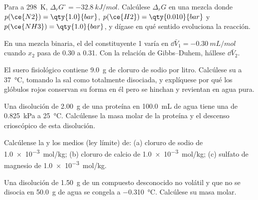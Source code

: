 \begin{exercise}[$\star$]\label{exo:b2:chemical-potential:4}
Para  a \qty{298}{K}, $\Delta_r G^\circ =
\qty{-32.8}{kJ/mol}$. Calcúlese $\Delta_r G$ en una mezcla donde
$p(\ce{N2}) = \qty{1.0}{bar}$, $p(\ce{H2}) = \qty{0.010}{bar}$ y
$p(\ce{NH3}) = \qty{1.0}{bar}$, y dígase en qué sentido evoluciona la reacción.
\end{exercise}

\begin{exercise}[$\star\star$]\label{exo:b2:chemical-potential:5}
En una mezcla binaria, el  del constituyente 1 varía en
$\dd\bar V_1 = \qty{-0.30}{mL/mol}$ cuando $x_2$ pasa de 0.30 a 0.31. Con la
relación de Gibbs--Duhem, hállese $\dd\bar V_2$.
\end{exercise}

\begin{exercise}[$\star\star$]\label{exo:b2:chemical-potential:6}
El suero fisiológico contiene \qty{9.0}{g} de cloruro de sodio por litro.
Calcúlese su  a \qty{37}{\celsius}, tomando la sal como totalmente
disociada, y explíquese por qué los glóbulos rojos conservan su forma en él pero se hinchan
y revientan en agua pura.
\end{exercise}

\begin{exercise}[$\star\star$]\label{exo:b2:chemical-potential:7}
Una disolución de \qty{2.00}{g} de una proteína en \qty{100.0}{mL} de agua tiene una
 de \qty{0.825}{kPa} a \qty{25}{\celsius}. Calcúlense la masa
molar de la proteína y el descenso crioscópico de esta disolución.
\end{exercise}

\begin{exercise}[$\star\star$]\label{exo:b2:chemical-potential:8}
Calcúlense la  y los  medios (ley límite)
de: (a) cloruro de sodio de \qty{1.0e-3}{mol/kg}; (b) cloruro de calcio de \qty{1.0e-3}{mol/kg};
(c) sulfato de magnesio de \qty{1.0e-3}{mol/kg}.
\end{exercise}

\begin{exercise}[$\star\star$]\label{exo:b2:chemical-potential:9}
Una disolución de \qty{1.50}{g} de un compuesto desconocido no volátil y que no se disocia
en \qty{50.0}{g} de agua se congela a \qty{-0.310}{\celsius}. Calcúlese
su masa molar.
\end{exercise}

